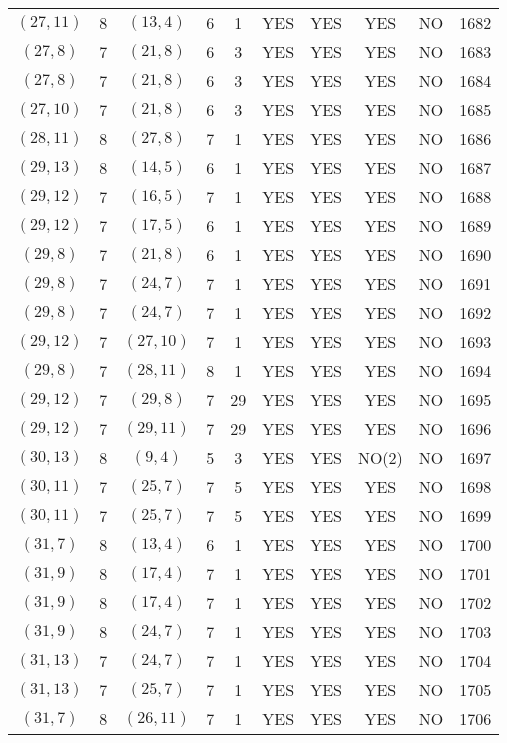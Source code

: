 \begin{longtable}{|c|c|c|c|c|c|c|c|c|c|}
$(27, 11)$ & 8 & $(13, 4)$ & 6 & 1 & YES & YES & YES & NO & 1682\\
$(27, 8)$ & 7 & $(21, 8)$ & 6 & 3 & YES & YES & YES & NO & 1683\\
$(27, 8)$ & 7 & $(21, 8)$ & 6 & 3 & YES & YES & YES & NO & 1684\\
$(27, 10)$ & 7 & $(21, 8)$ & 6 & 3 & YES & YES & YES & NO & 1685\\
$(28, 11)$ & 8 & $(27, 8)$ & 7 & 1 & YES & YES & YES & NO & 1686\\
$(29, 13)$ & 8 & $(14, 5)$ & 6 & 1 & YES & YES & YES & NO & 1687\\
$(29, 12)$ & 7 & $(16, 5)$ & 7 & 1 & YES & YES & YES & NO & 1688\\
$(29, 12)$ & 7 & $(17, 5)$ & 6 & 1 & YES & YES & YES & NO & 1689\\
$(29, 8)$ & 7 & $(21, 8)$ & 6 & 1 & YES & YES & YES & NO & 1690\\
$(29, 8)$ & 7 & $(24, 7)$ & 7 & 1 & YES & YES & YES & NO & 1691\\
$(29, 8)$ & 7 & $(24, 7)$ & 7 & 1 & YES & YES & YES & NO & 1692\\
$(29, 12)$ & 7 & $(27, 10)$ & 7 & 1 & YES & YES & YES & NO & 1693\\
$(29, 8)$ & 7 & $(28, 11)$ & 8 & 1 & YES & YES & YES & NO & 1694\\
$(29, 12)$ & 7 & $(29, 8)$ & 7 & 29 & YES & YES & YES & NO & 1695\\
$(29, 12)$ & 7 & $(29, 11)$ & 7 & 29 & YES & YES & YES & NO & 1696\\
$(30, 13)$ & 8 & $(9, 4)$ & 5 & 3 & YES & YES & NO(2) & NO & 1697\\
$(30, 11)$ & 7 & $(25, 7)$ & 7 & 5 & YES & YES & YES & NO & 1698\\
$(30, 11)$ & 7 & $(25, 7)$ & 7 & 5 & YES & YES & YES & NO & 1699\\
$(31, 7)$ & 8 & $(13, 4)$ & 6 & 1 & YES & YES & YES & NO & 1700\\
$(31, 9)$ & 8 & $(17, 4)$ & 7 & 1 & YES & YES & YES & NO & 1701\\
$(31, 9)$ & 8 & $(17, 4)$ & 7 & 1 & YES & YES & YES & NO & 1702\\
$(31, 9)$ & 8 & $(24, 7)$ & 7 & 1 & YES & YES & YES & NO & 1703\\
$(31, 13)$ & 7 & $(24, 7)$ & 7 & 1 & YES & YES & YES & NO & 1704\\
$(31, 13)$ & 7 & $(25, 7)$ & 7 & 1 & YES & YES & YES & NO & 1705\\
$(31, 7)$ & 8 & $(26, 11)$ & 7 & 1 & YES & YES & YES & NO & 1706\\

\end{longtable}
